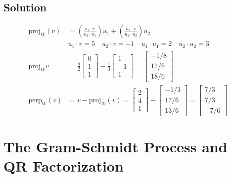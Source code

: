 \subsection*{Solution}
\begin{align*}
    \text{proj}_W(v) & =\left(\frac{u_1\cdot v}{u_1\cdot u_1}\right)u_1+\left(\frac{u_2\cdot v}{u_2\cdot u_2}\right)u_2        \\
                     & u_1\cdot v=5 \quad u_2\cdot v=-1 \quad u_1\cdot u_1=2 \quad u_2\cdot u_2=3                              \\
    \text{proj}_W{v} & =\frac{5}{2}\begin{bmatrix}
        0 \\1\\1
    \end{bmatrix}-\frac{1}{3}\begin{bmatrix}
        1 \\-1\\1
    \end{bmatrix}=\begin{bmatrix}
        -1/8 \\17/6\\18/6
    \end{bmatrix} \\
    \text{perp}_W(v) & =v-\text{proj}_W(v)=\begin{bmatrix}
        2 \\4\\1
    \end{bmatrix}-\begin{bmatrix}
        -1/3 \\17/6\\13/6
    \end{bmatrix}=\begin{bmatrix}
        7/3 \\7/3\\-7/6
    \end{bmatrix}
\end{align*}

\section{The Gram-Schmidt Process and QR Factorization}


